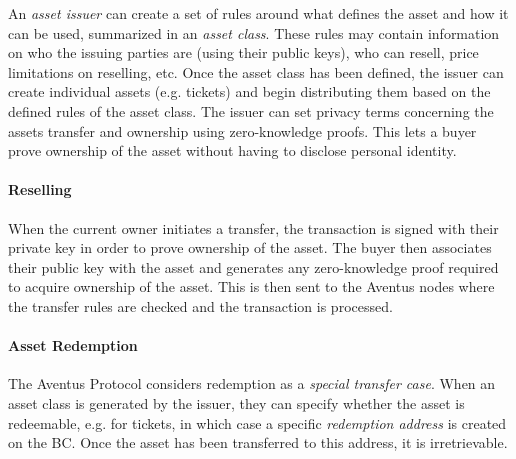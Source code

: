 An \textit{asset issuer} can create a set of rules around what defines the asset and how it can be used, summarized in an \textit{asset class}. These rules may contain information on who the issuing parties are (using their public keys), who can resell, price limitations on reselling, etc. Once the asset class has been defined, the issuer can create individual assets (e.g. tickets) and begin distributing them based on the defined rules of the asset class. The issuer can set privacy terms concerning the assets transfer and ownership using zero-knowledge proofs. This lets a buyer prove ownership of the asset without having to disclose personal identity.

\paragraph{Reselling}

When the current owner initiates a transfer, the transaction is signed with their private key in order to prove ownership of the asset. The buyer then associates their public key with the asset and generates any zero-knowledge proof required to acquire ownership of the asset. This is then sent to the Aventus nodes where the transfer rules are checked and the transaction is processed.

\paragraph{Asset Redemption}

The Aventus Protocol considers redemption as a \textit{special transfer case}. When an asset class is generated by the issuer, they can specify whether the asset is redeemable, e.g. for tickets, in which case a specific \textit{redemption address} is created on the BC. Once the asset has been transferred to this address, it is irretrievable.
